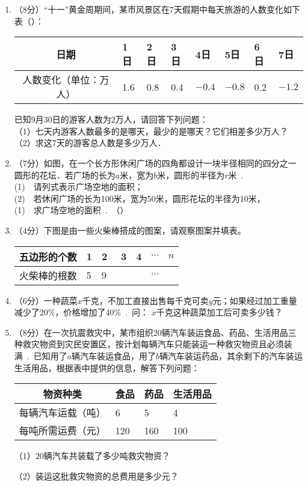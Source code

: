 ﻿\documentclass[11pt,twoside]{ctexart}
\begin{document}
\begin{enumerate}
\item （8分）“十一”黄金周期间，某市风景区在7天假期中每天旅游的人数变化如下表（）：\par\hfill\null
\begin{tabular}{|c|*{7}{|p{0.88cm}<{\centering}}|}
\hline
日期&1日&2日&3日&4日&5日&6日&7日\\\hline
人数变化（单位：万人）&1.6&0.8&0.4&$-0.4$&$-0.8$&0.2&$-1.2$\\\hline
\end{tabular}\hfill\null\par
已知9月30日的游客人数为2万人，请回答下列问题：\\
（1）七天内游客人数最多的是哪天，最少的是哪天？它们相差多少万人？\\
（2）求这7天的游客总人数是多少万人．
\vfill
\item （7分）如图，在一个长方形休闲广场的四角都设计一块半径相同的四分之一圆形的花坛．若广场的长为$a$米，宽为$b$米，圆形的半径为$r$米~.~\\
(1)~~请列式表示广场空地的面积；\\
(2)~~若休闲广场的长为100米，宽为50米，圆形花坛的半径为10米，\\
{\color{white}(1)}~~求广场空地的面积~.~（）\\
\vfill
\newpage
\item （4分）下图是由一些火柴棒搭成的图案，请观察图案并填表。\par\hfill\null
\begin{tabular}{|c|*{6}{|p{1.2cm}<{\centering}}|}
\hline
五边形的个数&1&2&3&4&$\cdots$&$n$\\\hline
火柴棒的根数&5&9~&~&~&$\cdots$&\\\hline
\end{tabular}\hfill\null


\item （6分）一种蔬菜$x$千克，不加工直接出售每千克可卖$y$元；如果经过加工重量减少了20\%，价格增加了40\%~.~问：
$x$千克这种蔬菜加工后可卖多少钱？
\vfill
\item （8分）在一次抗震救灾中，某市组织20辆汽车装运食品、药品、生活用品三种救灾物资到灾民安置区，按计划每辆汽车只能装运一种救灾物资且必须装满~.~已知用了$a$辆汽车装运食品，用了$b$辆汽车装运药品，其余剩下的汽车装运生活用品，根据表中提供的信息，解答下列问题：\par\hfill
\begin{tabular}{|c|*{3}{|p{2cm}<{\centering}}|}
\hline
物资种类&食品&药品&生活用品\\\hline
每辆汽车运载（吨）&6&5&4\\\hline
每吨所需运费（元）&120&160&100\\\hline
\end{tabular}\hfill\null\par
（1）20辆汽车共装载了多少吨救灾物资？\par
（2）装运这批救灾物资的总费用是多少元？
\vfill
\end{enumerate}
\end{document}
